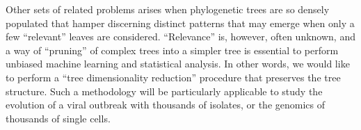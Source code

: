 \documentclass[a4paper,11pt]{article}
\begin{document}
Other sets of related problems arises when phylogenetic trees are so densely populated that hamper discerning distinct patterns that may emerge when only a few ``relevant'' leaves are considered.
``Relevance'' is, however, often unknown, and a way of ``pruning'' of complex trees into a simpler tree is essential to perform unbiased machine learning and statistical analysis.
In other words, we would like to perform a ``tree dimensionality reduction'' procedure that preserves the tree structure. Such a methodology will be particularly applicable to study the evolution of a viral outbreak with thousands of isolates, or the genomics of thousands of single cells.
\end{document}
